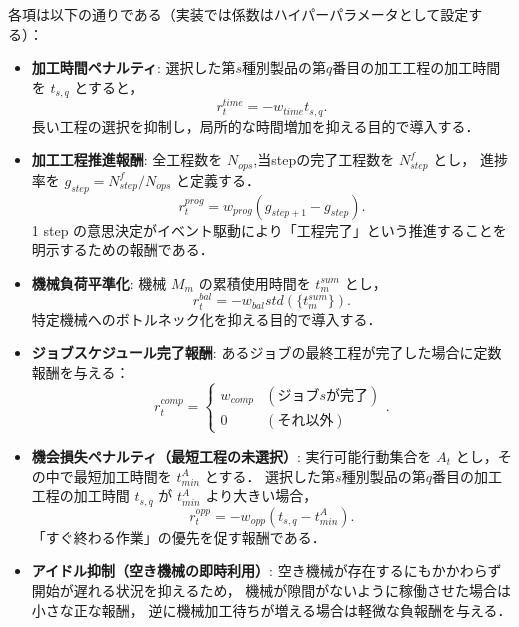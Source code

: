 \documentclass{jarticle}
\begin{document}
各項は以下の通りである（実装では係数はハイパーパラメータとして設定する）：

\begin{itemize}
  \item \textbf{加工時間ペナルティ}:
  選択した第$s$種別製品の第$q$番目の加工工程の加工時間を $t_{s,q}$ とすると，
  \begin{equation}
  r^{time}_t = - w_{time} t_{s,q} .
  \end{equation}
  長い工程の選択を抑制し，局所的な時間増加を抑える目的で導入する．

  \item \textbf{加工工程推進報酬}:
  全工程数を $N_{ops}$,当stepの完了工程数を $N^{f}_{step}$ とし，
  進捗率を $g_{step}=N^{f}_{step}/N_{ops}$ と定義する．
  \begin{equation}
  r^{prog}_t = w_{prog} (g_{step+1}-g_{step}) .
  \end{equation}
  1 step の意思決定がイベント駆動により「工程完了」という推進することを明示するための報酬である．

  \item \textbf{機械負荷平準化}:
  機械 $M_m$ の累積使用時間を $t^{sum}_m$ とし，
  \begin{equation}
  r^{bal}_t = - w_{bal} {std}\left(\{t^{sum}_m\}\right).
  \end{equation}
  特定機械へのボトルネック化を抑える目的で導入する．

  \item \textbf{ジョブスケジュール完了報酬}:
  あるジョブの最終工程が完了した場合に定数報酬を与える：
  \begin{equation}
  r^{comp}_t =
  \begin{cases}
  w_{comp} & (\text{ジョブ$s$が完了})\\
  0 & (\text{それ以外})
  \end{cases}.
  \end{equation}

  \item \textbf{機会損失ペナルティ（最短工程の未選択）}:
  実行可能行動集合を $A_t$ とし，その中で最短加工時間を $t^{A}_{min}$ とする．
  選択した第$s$種別製品の第$q$番目の加工工程の加工時間 $t_{s,q}$ が $t^{A}_{min}$ より大きい場合，
  \begin{equation}
  r^{opp}_t = - w_{opp} (t_{s,q} - t^{A}_{min}).
  \end{equation}
  「すぐ終わる作業」の優先を促す報酬である．

  \item \textbf{アイドル抑制（空き機械の即時利用）}:
  空き機械が存在するにもかかわらず開始が遅れる状況を抑えるため，
  機械が隙間がないように稼働させた場合は小さな正な報酬，
  逆に機械加工待ちが増える場合は軽微な負報酬を与える．


\end{itemize}
\end{document}
